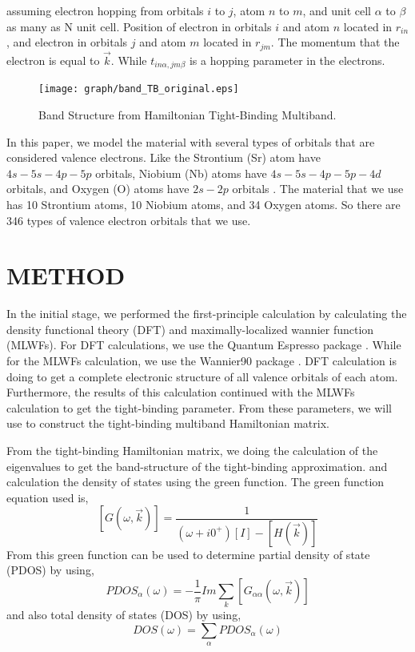 \documentclass{aip-cp}
\begin{document}
assuming electron hopping from orbitals $i$ to $j$, atom $n$ to $m$, and unit cell $\alpha$ to $\beta$ as many as N unit cell. Position of electron in orbitals $i$ and atom $n$ located in $r_{in}$, and electron in orbitals $j$ and atom $m$ located in $r_{jm}$. The momentum that the electron is equal to $\vec{k}$. While $t_{in\alpha, jm\beta}$ is a hopping parameter in the electrons.

\begin{figure}[b]
  \centerline{\texttt{[image: graph/band\_TB\_original.eps]}}
  \caption{Band Structure from Hamiltonian Tight-Binding Multiband.}
\end{figure}

In this paper, we model the material with several types of orbitals that are considered valence electrons. Like the Strontium (Sr) atom have $ 4s-5s-4p-5p $ orbitals, Niobium (Nb) atoms have $ 4s-5s-4p-5p-4d $ orbitals, and Oxygen (O) atoms have $ 2s-2p $ orbitals . The material that we use has 10 Strontium atoms, 10 Niobium atoms, and 34 Oxygen \cite{persson} atoms. So there are 346 types of valence electron orbitals that we use.

\section{METHOD}
In the initial stage, we performed the first-principle calculation by calculating the density functional theory (DFT) and maximally-localized wannier function (MLWFs). For DFT calculations, we use the Quantum Espresso package \cite{QE-2017, QE-2009}. While for the MLWFs calculation, we use the Wannier90 package \cite{wannier}. DFT calculation is doing to get a complete electronic structure of all valence orbitals of each atom. Furthermore, the results of this calculation continued with the MLWFs calculation to get the tight-binding parameter. From these parameters, we will use to construct the tight-binding multiband Hamiltonian matrix.

From the tight-binding Hamiltonian matrix, we doing the calculation of the eigenvalues to get the band-structure of the tight-binding approximation. and calculation the density of states using the green function. The green function equation used is,
$$ [G(\omega, \vec{k})] = \frac{1}{(\omega + i0^{+})[I] - [H(\vec{k})]} $$
From this green function can be used to determine partial density of state (PDOS) by using,
$$ PDOS_\alpha(\omega) = -\frac{1}{\pi}Im\sum_k{[G_{\alpha \alpha}(\omega, \vec{k})]} $$
and also total density of states (DOS) by using,
$$ DOS (\omega) = \sum_\alpha{PDOS_\alpha(\omega)}$$
\end{document}
